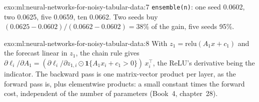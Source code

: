 \begin{solution}{exo:ml:neural-networks-for-noisy-tabular-data:7}
\texttt{ensemble(n)}: one seed 0.0602, two 0.0625, five 0.0659, ten 0.0662. Two seeds buy $(0.0625 - 0.0602)/(0.0662 -
0.0602) = 38\%$ of the gain, five seeds 95\%.
\end{solution}

\begin{solution}{exo:ml:neural-networks-for-noisy-tabular-data:8}
With $z_1 = \mathrm{relu}(A_1x + c_1)$ and the forecast linear in $z_1$, the chain rule gives $\partial\ell_i/\partial A_1 =
(\partial\ell_i/\partial z_{1,i}\odot\mathbf 1\{A_1x_i + c_1 > 0\})\,x_i^\top$, the ReLU's derivative being the
indicator. The backward pass is one matrix-vector product per layer, as the forward pass is, plus elementwise products:
a small constant times the forward cost, independent of the number of parameters (Book~4, chapter~28).
\end{solution}

